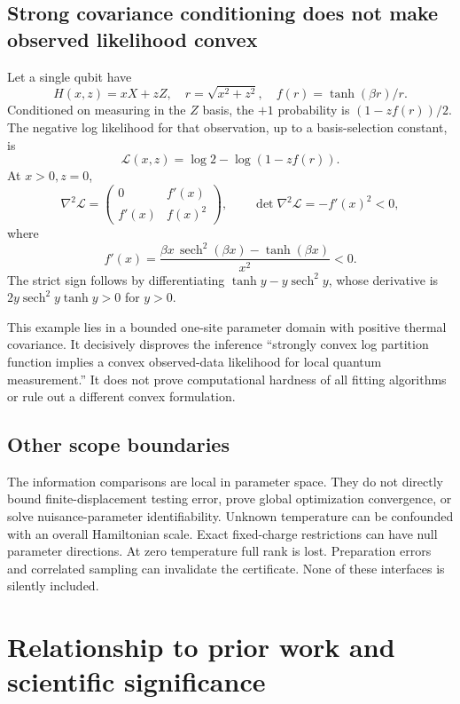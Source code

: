 \documentclass[11pt,a4paper]{article}
\theoremstyle{remark}
\begin{document}
\subsection{Strong covariance conditioning does not make observed likelihood convex}
Let a single qubit have
\[
 H(x,z)=xX+zZ,\quad r=\sqrt{x^2+z^2},\quad f(r)=\tanh(\beta r)/r.
\]
Conditioned on measuring in the $Z$ basis, the $+1$ probability is $(1-zf(r))/2$. The negative log likelihood for that observation, up to a basis-selection constant, is
\[
 \mathcal L(x,z)=\log2-\log(1-zf(r)).
\]
At $x>0,z=0$,
\begin{equation}
 \nabla^2\mathcal L=
 \begin{pmatrix}0&f'(x)\\ f'(x)&f(x)^2\end{pmatrix},\qquad
 \det\nabla^2\mathcal L=-f'(x)^2<0,
 \label{eq:nonconvex}
\end{equation}
where
\[
 f'(x)=\frac{\beta x\,\operatorname{sech}^2(\beta x)-\tanh(\beta x)}{x^2}<0.
\]
The strict sign follows by differentiating $\tanh y-y\operatorname{sech}^2y$, whose derivative is $2y\operatorname{sech}^2y\tanh y>0$ for $y>0$.

This example lies in a bounded one-site parameter domain with positive thermal covariance. It decisively disproves the inference ``strongly convex log partition function implies a convex observed-data likelihood for local quantum measurement.'' It does not prove computational hardness of all fitting algorithms or rule out a different convex formulation.

\subsection{Other scope boundaries}
The information comparisons are local in parameter space. They do not directly bound finite-displacement testing error, prove global optimization convergence, or solve nuisance-parameter identifiability. Unknown temperature can be confounded with an overall Hamiltonian scale. Exact fixed-charge restrictions can have null parameter directions. At zero temperature full rank is lost. Preparation errors and correlated sampling can invalidate the certificate. None of these interfaces is silently included.

\section{Relationship to prior work and scientific significance}
\end{document}
